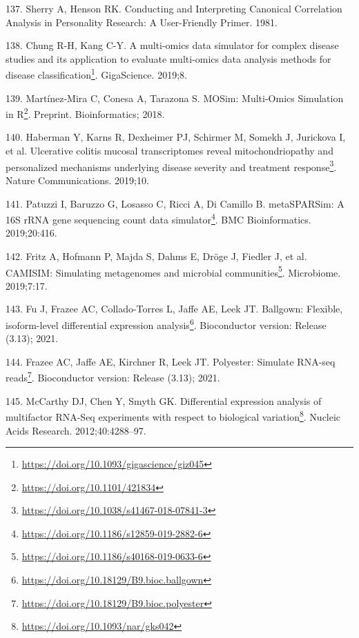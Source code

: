\documentclass[
  a4paper,
]{book}
\DeclareRobustCommand{\href}[2]{#2\footnote{\url{#1}}}
\newlength{\cslhangindent}
\newlength{\cslentryspacingunit} %
\newenvironment{CSLReferences}[2] %
 {%
  \setlength{\parindent}{0pt}
  \ifodd #1
  \let\oldpar\par
  \def\par{\hangindent=\cslhangindent\oldpar}
  \fi
  \setlength{\parskip}{#2\cslentryspacingunit}
 }%
 {}
\begin{document}
\begin{CSLReferences}{0}{0}
\leavevmode{}%
137. Sherry A, Henson RK. Conducting and {Interpreting Canonical Correlation Analysis} in {Personality Research}: {A User}-{Friendly Primer}. 1981.

\leavevmode{}%
138. Chung R-H, Kang C-Y. \href{https://doi.org/10.1093/gigascience/giz045}{A multi-omics data simulator for complex disease studies and its application to evaluate multi-omics data analysis methods for disease classification}. GigaScience. 2019;8.

\leavevmode{}%
139. Martínez-Mira C, Conesa A, Tarazona S. \href{https://doi.org/10.1101/421834}{{MOSim}: {Multi}-{Omics Simulation} in {R}}. Preprint. {Bioinformatics}; 2018.

\leavevmode{}%
140. Haberman Y, Karns R, Dexheimer PJ, Schirmer M, Somekh J, Jurickova I, et al. \href{https://doi.org/10.1038/s41467-018-07841-3}{Ulcerative colitis mucosal transcriptomes reveal mitochondriopathy and personalized mechanisms underlying disease severity and treatment response}. Nature Communications. 2019;10.

\leavevmode{}%
141. Patuzzi I, Baruzzo G, Losasso C, Ricci A, Di Camillo B. \href{https://doi.org/10.1186/s12859-019-2882-6}{metaSPARSim: A 16S rRNA gene sequencing count data simulator}. BMC Bioinformatics. 2019;20:416.

\leavevmode{}%
142. Fritz A, Hofmann P, Majda S, Dahms E, Dröge J, Fiedler J, et al. \href{https://doi.org/10.1186/s40168-019-0633-6}{CAMISIM: Simulating metagenomes and microbial communities}. Microbiome. 2019;7:17.

\leavevmode{}%
143. Fu J, Frazee AC, Collado-Torres L, Jaffe AE, Leek JT. \href{https://doi.org/10.18129/B9.bioc.ballgown}{Ballgown: Flexible, isoform-level differential expression analysis}. Bioconductor version: Release (3.13); 2021.

\leavevmode{}%
144. Frazee AC, Jaffe AE, Kirchner R, Leek JT. \href{https://doi.org/10.18129/B9.bioc.polyester}{Polyester: Simulate RNA-seq reads}. Bioconductor version: Release (3.13); 2021.

\leavevmode{}%
145. McCarthy DJ, Chen Y, Smyth GK. \href{https://doi.org/10.1093/nar/gks042}{Differential expression analysis of multifactor RNA-Seq experiments with respect to biological variation}. Nucleic Acids Research. 2012;40:4288--97.


\end{CSLReferences}
\end{document}
